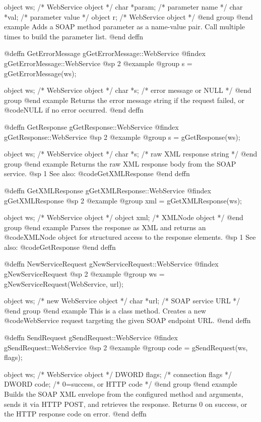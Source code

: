object  ws;      /*  WebService object  */
char    *param;  /*  parameter name     */
char    *val;    /*  parameter value    */
object  r;       /*  WebService object  */
@end group
@end example
Adds a SOAP method parameter as a name-value pair.  Call multiple times
to build the parameter list.
@end deffn



@deffn {GetErrorMessage} gGetErrorMessage::WebService
@findex gGetErrorMessage::WebService
@sp 2
@example
@group
s = gGetErrorMessage(ws);

object  ws;   /*  WebService object        */
char    *s;   /*  error message or NULL    */
@end group
@end example
Returns the error message string if the request failed, or @code{NULL}
if no error occurred.
@end deffn



@deffn {GetResponse} gGetResponse::WebService
@findex gGetResponse::WebService
@sp 2
@example
@group
s = gGetResponse(ws);

object  ws;   /*  WebService object        */
char    *s;   /*  raw XML response string  */
@end group
@end example
Returns the raw XML response body from the SOAP service.
@sp 1
See also:  @code{GetXMLResponse}
@end deffn



@deffn {GetXMLResponse} gGetXMLResponse::WebService
@findex gGetXMLResponse
@sp 2
@example
@group
xml = gGetXMLResponse(ws);

object  ws;    /*  WebService object   */
object  xml;   /*  XMLNode object      */
@end group
@end example
Parses the response as XML and returns an @code{XMLNode} object for
structured access to the response elements.
@sp 1
See also:  @code{GetResponse}
@end deffn



@deffn {NewServiceRequest} gNewServiceRequest::WebService
@findex gNewServiceRequest
@sp 2
@example
@group
ws = gNewServiceRequest(WebService, url);

object  ws;    /*  new WebService object  */
char    *url;  /*  SOAP service URL       */
@end group
@end example
This is a class method.  Creates a new @code{WebService} request
targeting the given SOAP endpoint URL.
@end deffn



@deffn {SendRequest} gSendRequest::WebService
@findex gSendRequest::WebService
@sp 2
@example
@group
code = gSendRequest(ws, flags);

object  ws;     /*  WebService object         */
DWORD   flags;  /*  connection flags          */
DWORD   code;   /*  0=success, or HTTP code   */
@end group
@end example
Builds the SOAP XML envelope from the configured method and arguments,
sends it via HTTP POST, and retrieves the response.  Returns 0 on
success, or the HTTP response code on error.
@end deffn



